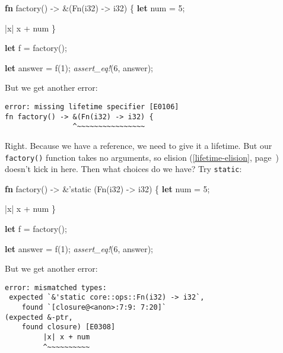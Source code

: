 \documentclass[a4paper,]{book}
\renewcommand*{\hyperref}[2][\ar]{%
  \def\ar{#2}%
  #2 (\autoref{#1}, page~\pageref{#1})}
\newenvironment{Shaded}{\begin{snugshade}}{\end{snugshade}}
\newcommand{\KeywordTok}[1]{\textcolor[rgb]{0.13,0.29,0.53}{\textbf{{#1}}}}
\newcommand{\DataTypeTok}[1]{\textcolor[rgb]{0.13,0.29,0.53}{{#1}}}
\newcommand{\DecValTok}[1]{\textcolor[rgb]{0.00,0.00,0.81}{{#1}}}
\newcommand{\OtherTok}[1]{\textcolor[rgb]{0.56,0.35,0.01}{{#1}}}
\newcommand{\BuiltInTok}[1]{{#1}}
\newcommand{\PreprocessorTok}[1]{\textcolor[rgb]{0.56,0.35,0.01}{\textit{{#1}}}}
\newcommand{\NormalTok}[1]{{#1}}
\begin{document}
\begin{Shaded}
\begin{Highlighting}[]
\KeywordTok{fn} \NormalTok{factory() -> &(}\BuiltInTok{Fn}\NormalTok{(}\DataTypeTok{i32}\NormalTok{) -> }\DataTypeTok{i32}\NormalTok{) \{}
    \KeywordTok{let} \NormalTok{num = }\DecValTok{5}\NormalTok{;}

    \NormalTok{|x| x + num}
\NormalTok{\}}

\KeywordTok{let} \NormalTok{f = factory();}

\KeywordTok{let} \NormalTok{answer = f(}\DecValTok{1}\NormalTok{);}
\PreprocessorTok{assert_eq!}\NormalTok{(}\DecValTok{6}\NormalTok{, answer);}
\end{Highlighting}
\end{Shaded}

But we get another error:

\begin{verbatim}
error: missing lifetime specifier [E0106]
fn factory() -> &(Fn(i32) -> i32) {
                ^~~~~~~~~~~~~~~~~
\end{verbatim}

Right. Because we have a reference, we need to give it a lifetime. But
our \texttt{factory()} function takes no arguments, so
\hyperref[lifetime-elision]{elision} doesn't kick in here. Then what
choices do we have? Try \texttt{\textquotesingle{}static}:

\begin{Shaded}
\begin{Highlighting}[]
\KeywordTok{fn} \NormalTok{factory() -> &}\OtherTok{'static} \NormalTok{(}\BuiltInTok{Fn}\NormalTok{(}\DataTypeTok{i32}\NormalTok{) -> }\DataTypeTok{i32}\NormalTok{) \{}
    \KeywordTok{let} \NormalTok{num = }\DecValTok{5}\NormalTok{;}

    \NormalTok{|x| x + num}
\NormalTok{\}}

\KeywordTok{let} \NormalTok{f = factory();}

\KeywordTok{let} \NormalTok{answer = f(}\DecValTok{1}\NormalTok{);}
\PreprocessorTok{assert_eq!}\NormalTok{(}\DecValTok{6}\NormalTok{, answer);}
\end{Highlighting}
\end{Shaded}

But we get another error:

\begin{verbatim}
error: mismatched types:
 expected `&'static core::ops::Fn(i32) -> i32`,
    found `[closure@<anon>:7:9: 7:20]`
(expected &-ptr,
    found closure) [E0308]
         |x| x + num
         ^~~~~~~~~~~
\end{verbatim}
\end{document}

